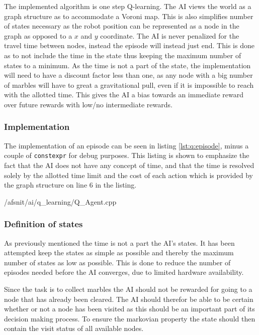 \documentclass[../../../Main.tex]{subfiles}
\begin{document}
The implemented algorithm is one step Q-learning.
The AI views the world as a graph structure as to accommodate a Voroni map. This is also simplifies
number of states necessary as the robot position can be represented as a node in the graph as opposed
to a $x$ and $y$ coordinate.
The AI is never penalized for the travel time between nodes, instead the episode will instead just
end. This is done as to not include the time in the state thus keeping the maximum number of states 
to a minimum.
As the time is not a part of the state, the implementation will need to have a discount factor less
than one, as any node with a big number of marbles will have to great a gravitational pull, even if
it is impossible to reach with the allotted time. This gives the AI a bias towards an immediate
reward over future rewards with low/no intermediate rewards.


\subsubsection{Implementation}%
\label{ssub:implementation}
The implementation of an episode can be seen in listing \ref{lst:q:episode}, minus a couple of
\texttt{constexpr} for debug purposes. This listing is shown to emphasize the fact that the AI
does not have any concept of time, and that the time is resolved solely by the allotted time
limit and the cost of each action which is provided by the graph structure on line 6 in the listing.


{\main/afsnit/ai/q_learning/Q_Agent.cpp}

\subsubsection{Definition of states}%
\label{ssub:states}

As previously mentioned the time is not a part the AI's states. It has been attempted keep the states
as simple as possible and thereby the maximum number of states as low as possible. This is done to reduce
the number of episodes needed before the AI converges, due to limited hardware availability.

Since the task is to collect marbles the AI should not be rewarded for going to a node that has
already been cleared. The AI should therefor be able to be certain whether or not a node has been visited
as this should be an important part of its decision making process. To ensure the markovian property
the state should then contain the visit status of all available nodes.
\end{document}

